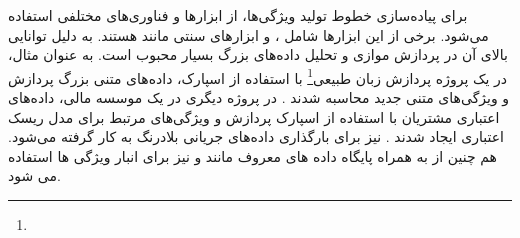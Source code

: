 برای پیاده‌سازی خطوط تولید ویژگی‌ها، از ابزارها و فناوری‌های مختلفی استفاده می‌شود. برخی از این ابزارها شامل ،  و ابزارهای  سنتی مانند  هستند.  به دلیل توانایی بالای آن در پردازش موازی و تحلیل داده‌های بزرگ بسیار محبوب است. به عنوان مثال، در یک پروژه پردازش زبان طبیعی\footnote{} با استفاده از اسپارک، داده‌های متنی بزرگ پردازش و ویژگی‌های متنی جدید محاسبه شدند \cite{MLOpsArchfeature1}. در پروژه دیگری در یک موسسه مالی، داده‌های اعتباری مشتریان با استفاده از اسپارک پردازش و ویژگی‌های مرتبط برای مدل ریسک اعتباری ایجاد شدند \cite{MLOpsArchfeature2}. 
 \cite{Kafka} نیز برای بارگذاری داده‌های جریانی بلادرنگ به کار گرفته می‌شود.
هم چنین از  به همراه پایگاه داده های معروف مانند  و  نیز برای انبار ویژگی ها استفاده می شود.
